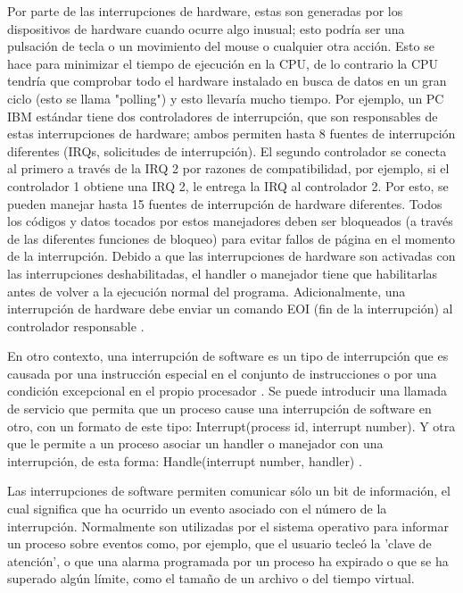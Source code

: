 \documentclass[12pt]{article}
\begin{document}
{Por parte de las interrupciones de hardware, estas son generadas por los dispositivos de hardware cuando ocurre algo inusual; esto podría ser una pulsación de tecla o un movimiento del mouse o cualquier otra acción. Esto se hace para minimizar el tiempo de ejecución en la CPU, de lo contrario la CPU tendría que comprobar todo el hardware instalado en busca de datos en un gran ciclo (esto se llama "polling") y esto llevaría mucho tiempo. Por ejemplo, un PC IBM estándar tiene dos controladores de interrupción, que son responsables de estas interrupciones de hardware; ambos permiten hasta 8 fuentes de interrupción diferentes (IRQs, solicitudes de interrupción). El segundo controlador se conecta al primero a través de la IRQ 2 por razones de compatibilidad, por ejemplo, si el controlador 1 obtiene una IRQ 2, le entrega la IRQ al controlador 2. Por esto, se pueden manejar hasta 15 fuentes de interrupción de hardware diferentes. Todos los códigos y datos tocados por estos manejadores deben ser bloqueados (a través de las diferentes funciones de bloqueo) para evitar fallos de página en el momento de la interrupción. Debido a que las interrupciones de hardware son activadas con las interrupciones deshabilitadas, el handler o manejador tiene que habilitarlas antes de volver a la ejecución normal del programa. Adicionalmente, una interrupción de hardware debe enviar un comando EOI (fin de la interrupción) al controlador responsable \citep{Hard}.
\newline

En otro contexto, una interrupción de software es un tipo de interrupción que es causada por una instrucción especial en el conjunto de instrucciones o por una condición excepcional en el propio procesador \citep{Softtech}. Se puede introducir una llamada de servicio que permita que un proceso cause una interrupción de software en otro, con un formato de este tipo: Interrupt(process id, interrupt number). Y otra que le permite a un proceso asociar un handler o manejador con una interrupción, de esta forma: Handle(interrupt number, handler) \citep{Softm}.
\newline

Las interrupciones de software permiten comunicar sólo un bit de información, el cual significa que ha ocurrido un evento asociado con el número de la interrupción. Normalmente son utilizadas por el sistema operativo para informar un proceso sobre eventos como, por ejemplo, que el usuario tecleó la 'clave de atención', o que una alarma programada por un proceso ha expirado o que se ha superado algún límite, como el tamaño de un archivo o del tiempo virtual.
\newline

}
\end{document}
